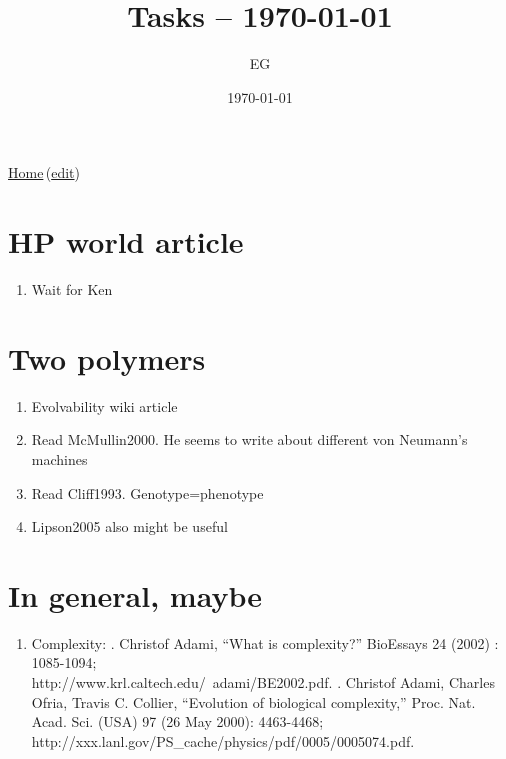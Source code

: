 \documentclass[12pt]{paper}
\title{Tasks  -- \today}
\author{EG}
\date{\today}
\newcommand{\wikilink}[2] { \href{#1.pdf}{#2}\,(\href{#1.tex}{edit})}
\begin{document}
 \maketitle
\wikilink{home}{Home}

\section{HP world article}
\begin{enumerate}
 \item Wait for Ken
\end{enumerate}

\section{Two polymers}
\begin{enumerate}
 \item Evolvability wiki article
 \item Read McMullin2000. He seems to write about different von Neumann's machines
 \item Read Cliff1993. Genotype=phenotype
 \item Lipson2005 also might be useful
\end{enumerate}

\section{In general, maybe}
\begin{enumerate}
\item Complexity:
. Christof Adami, ``What is complexity?''
BioEssays 24 (2002) : 1085-1094; \\
http://www.krl.caltech.edu/~adami/BE2002.pdf.
. Christof Adami, Charles Ofria, Travis C. Collier, “Evolution of biological
complexity,” Proc. Nat. Acad. Sci. (USA) 97 (26 May 2000): 4463-4468; \\
http://xxx.lanl.gov/PS\_cache/physics/pdf/0005/0005074.pdf.
\end{enumerate}
\end{document}
